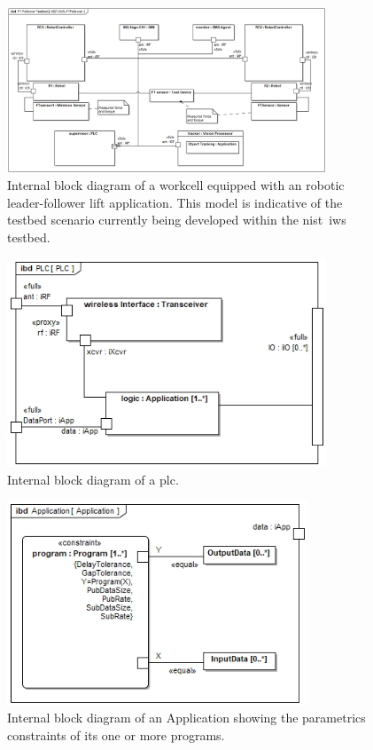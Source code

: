 \begin{figure}[!th]
	\centering
	\includegraphics[width=0.85\textwidth]{chapter-conclusions/images/NIST-IWS-FTFollower}
	\caption{Internal block diagram of a workcell equipped with an robotic leader-follower lift application.  This model is indicative of the testbed scenario currently being developed within the \gls{nist}~\gls{iws} testbed. }
	\label{fig:concl:lfscenario-full}
\end{figure}

\begin{figure}[!th]
	\centering
	\includegraphics[width=0.85\textwidth]{chapter-conclusions/images/PLC}
	\caption{Internal block diagram of a \gls{plc}.}
	\label{fig:concl:plc-ibd}
\end{figure}

\begin{figure}[!th]
	\centering
	\includegraphics[width=0.8\textwidth]{chapter-conclusions/images/Application}
	\caption{Internal block diagram of an Application showing the parametrics constraints of its one or more programs.}
	\label{fig:concl:Application-ibd}
\end{figure}

